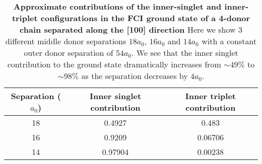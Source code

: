 \begin{table}[htb!]
    \centering
    \begin{tabular}{|c|c|c|}
    \hline
     Separation ($a_0$) & Inner singlet contribution & Inner triplet contribution  \\ \hline
     18 & 0.4927 & 0.483  \\ \hline
     16 & 0.9209 & 0.06706 \\ \hline
     14 & 0.97904 & 0.00238 \\ \hline
\end{tabular} 
    \caption{\textbf{Approximate contributions of the inner-singlet and inner-triplet configurations in the FCI ground state of a 4-donor chain separated along the [100] direction} Here we show 3 different middle donor separations $18a_0$, $16a_0$ and $14a_0$ with a constant outer donor separation of $54a_0$. We see that the inner singlet contribution to the ground state dramatically increases from $\sim49\%$ to $\sim98\%$ as the separation decreases by $4a_0$.}
    \label{tab:contrib}
\end{table}


